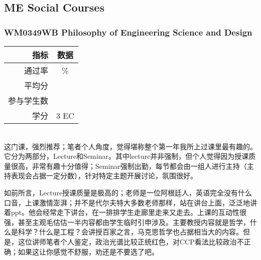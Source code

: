 \subsection{ME Social Courses}
\subsubsection{WM0349WB Philosophy of Engineering Science and Design}
\begin{minipage}{0.45\textwidth}
\centering
{}
\end{minipage}%
\begin{minipage}{0.45\textwidth}
\raggedleft
\begin{tabular}{r|c}
\textbf{指标} & \textbf{数据} \\ \hline
通过率 & \% \\ 
平均分 &  \\ 
参与学生数 &  \\
学分 & 3 EC\\
\end{tabular}
\end{minipage}\\

这门课，强烈推荐；笔者个人角度，觉得堪称整个第一年我所上过课里最有趣的。它分为两部分，Lecture和Seminar。其中lecture并非强制，但个人觉得因为授课质量很高，非常有趣十分值得；Seminar强制出勤，每节都会由一组人进行主持（主持表现会占据一定分数），针对特定主题开展讨论，氛围很好。

如前所言，Lecture授课质量是极高的；老师是一位阿根廷人，英语完全没有什么口音，上课激情澎湃；并不是代尔夫特大多数老师那样，站在讲台上面，泛泛地讲着ppt。他会经常走下讲台，在一排排学生走廊里走来又走去。上课的互动性很强，甚至主观毛估估一半内容都由学生临时引申涉及。主要教授内容就是哲学，什么是科学？什么是工程？会讲授百家之言，马克思哲学也占据相当大的内容。但是，这位讲师笔者个人鉴定，政治光谱比较正统红色，对CCP看法比较政治不正确；如果这让你感觉不舒服，劝还是不要选了吧。

